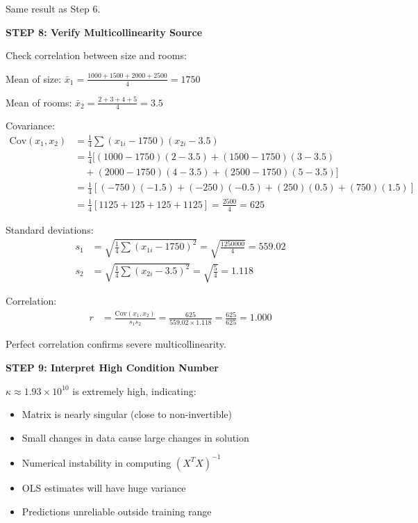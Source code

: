\documentclass[12pt]{article}
\begin{document}
\begin{solution}
Same result as Step 6.

\textbf{STEP 8: Verify Multicollinearity Source}

Check correlation between size and rooms:

Mean of size: $\bar{x}_1 = \frac{1000+1500+2000+2500}{4} = 1750$

Mean of rooms: $\bar{x}_2 = \frac{2+3+4+5}{4} = 3.5$

Covariance:
\begin{align*}
\text{Cov}(x_1, x_2) &= \frac{1}{4}\sum (x_{1i} - 1750)(x_{2i} - 3.5) \\
&= \frac{1}{4}[(1000-1750)(2-3.5) + (1500-1750)(3-3.5) \\
&\quad + (2000-1750)(4-3.5) + (2500-1750)(5-3.5)] \\
&= \frac{1}{4}[(-750)(-1.5) + (-250)(-0.5) + (250)(0.5) + (750)(1.5)] \\
&= \frac{1}{4}[1125 + 125 + 125 + 1125] = \frac{2500}{4} = 625
\end{align*}

Standard deviations:
\begin{align*}
s_1 &= \sqrt{\frac{1}{4}\sum (x_{1i} - 1750)^2} = \sqrt{\frac{1250000}{4}} = 559.02 \\
s_2 &= \sqrt{\frac{1}{4}\sum (x_{2i} - 3.5)^2} = \sqrt{\frac{5}{4}} = 1.118
\end{align*}

Correlation:
\begin{align*}
r &= \frac{\text{Cov}(x_1, x_2)}{s_1 s_2} = \frac{625}{559.02 \times 1.118} = \frac{625}{625} = 1.000
\end{align*}

Perfect correlation confirms severe multicollinearity.

\textbf{STEP 9: Interpret High Condition Number}

$\kappa \approx 1.93 \times 10^{10}$ is extremely high, indicating:

\begin{itemize}
\item Matrix is nearly singular (close to non-invertible)
\item Small changes in data cause large changes in solution
\item Numerical instability in computing $(X^TX)^{-1}$
\item OLS estimates will have huge variance
\item Predictions unreliable outside training range
\end{itemize}


\end{solution}
\end{document}
